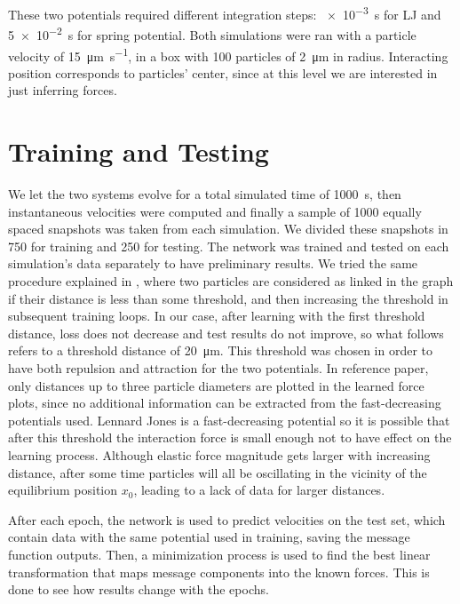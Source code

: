 \documentclass[../../master_thesis_np.tex]{subfiles}
\begin{document}
These two potentials required different integration steps: \SI{e-3}{\second} for LJ and \SI{5e-2}{\second} for spring potential.
Both simulations were ran with a particle velocity of \SI{15}{\um \per \second}, in a  box with \num{100} particles of \SI{2}{\um} in radius.
Interacting position corresponds to particles' center, since at this level we are interested in just inferring forces.

\section{Training and Testing}

We let the two systems evolve for a total simulated time of \SI{1000}{\second}, then instantaneous velocities were computed and finally a sample of \num{1000} equally spaced snapshots was taken from each simulation.
We divided these snapshots in \num{750} for training and \num{250} for testing.
The network was trained and tested on each simulation's data separately to have preliminary results.
We tried the same procedure explained in \cite{ruiz-garcia_discovering_2024}, where two particles are considered as linked in the graph if their distance is less than some threshold, and then increasing the threshold in subsequent training loops.
In our case, after learning with the first threshold distance, loss does not decrease and test results do not improve, so what follows refers to a threshold distance of \SI{20}{\um}.
This threshold was chosen in order to have both repulsion and attraction for the two potentials.
In reference paper, only distances up to three particle diameters are plotted in the learned force plots, since no additional information can be extracted from the fast-decreasing potentials \citeauthor{ruiz-garcia_discovering_2024} used.
Lennard Jones is a fast-decreasing potential so it is possible that after this threshold the interaction force is small enough not to have effect on the learning process.
Although elastic force magnitude gets larger with increasing distance, after some time particles will all be oscillating in the vicinity of the equilibrium position $x_0$, leading to a lack of data for larger distances.

After each epoch, the network is used to predict velocities on the test set, which contain data with the same potential used in training, saving the message function outputs.
Then, a minimization process is used to find the best linear transformation that maps message components into the known forces.
This is done to see how results change with the epochs.
\end{document}
